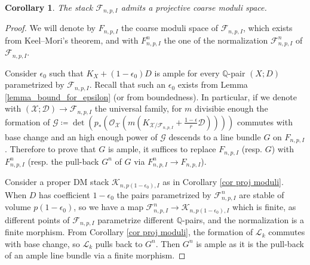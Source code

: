 \documentclass{amsart}
\newcommand{\bQ}{\mathbb{Q}}
\newcommand{\sD}{\mathscr{D}}
\newcommand{\sF}{\mathscr{F}}
\newcommand{\sG}{\mathscr{G}}
\newcommand{\sX}{\mathscr{X}}
\newcommand{\cK}{\mathcal{K}}
\newcommand{\cL}{\mathcal{L}}
\newcommand{\cO}{\mathcal{O}}
\newtheorem{Cor}[theorem]{Corollary}
\theoremstyle{definition}
\begin{document}
\begin{Cor}\label{cor_projectivity_our_moduli} The stack $\sF_{n,p,I}$ admits a projective coarse moduli space.
\end{Cor}
\begin{proof}
We will denote by $F_{n,p,I}$ the coarse moduli space of $\sF_{n,p,I}$, which exists from Keel--Mori's theorem, and with $F_{n,p,I}^n$ the one of the normalization $\sF_{n,p,I}^n$ of $\sF_{n,p,I}$.

Consider $\epsilon_0$ such that $K_X+(1-\epsilon_0)D$ is ample for every $\bQ$-pair $(X;D)$ parametrized by $\sF_{n,p,I}$. Recall that such an
$\epsilon_0$ exists from Lemma \ref{lemma_bound_for_epsilon} (or from boundedness). In particular, if we denote with $(\sX;\sD)\to \sF_{n,p,I}$ the universal family, for $m$ divisibie enough the formation of $\sG \coloneqq  \det(p_*(\cO_{\sX}(m(K_{\sX/\sF_{n,p,I}} + \frac{1-\epsilon}{r}\sD))))$ commutes with base change and an high enough power of $\sG$ descends to a line bundle $G$ on $F_{n,p,I}$. Therefore to prove that $G$ is ample, it suffices to replace $F_{n,p,I}$ (resp. $G$) with $F_{n,p,I}^n$ (resp. the pull-back $G^n$ of $G$ via $F_{n,p,I}^n \to F_{n,p,I}$).

Consider a proper DM stack $\cK_{n,p(1-\epsilon_0),I}$ as in Corollary \ref{cor proj moduli}. When $D$ has coefficient $1-\epsilon_0$ the pairs parametrized by $\sF_{n,p,I}^n$ are stable of volume $p(1-\epsilon_0)$, so we have a map $\sF_{n,p,I}^n\to \cK_{n,p(1-\epsilon_0),I}$ which is finite, as different points of $\sF_{n,p,I}$ parametrize different $\bQ$-pairs, and the normalization is a finite morphism. From Corollary \ref{cor proj moduli}, the formation of $\cL_k$ commutes with base change, so $\cL_k$ pulls back to $G^n$. Then $G^n$ is ample as it is the pull-back of an ample line bundle via a finite morphism.\end{proof}





\end{document}
